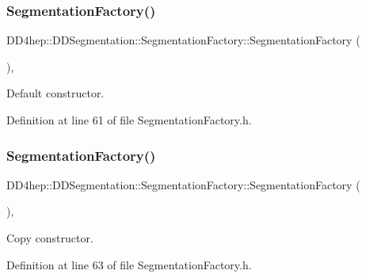 \subsubsection{\texorpdfstring{Segmentation\+Factory()}{SegmentationFactory()}\hspace{0.1cm}{\footnotesize\ttfamily [1/2]}}
{\footnotesize\ttfamily D\+D4hep\+::\+D\+D\+Segmentation\+::\+Segmentation\+Factory\+::\+Segmentation\+Factory (\begin{DoxyParamCaption}{ }\end{DoxyParamCaption})\hspace{0.3cm}{\ttfamily [inline]}, {\ttfamily [protected]}}



Default constructor. 



Definition at line 61 of file Segmentation\+Factory.\+h.

\hypertarget{class_d_d4hep_1_1_d_d_segmentation_1_1_segmentation_factory_a6255e4a05ac17c8e9d14d602dbc9d925}{}\label{class_d_d4hep_1_1_d_d_segmentation_1_1_segmentation_factory_a6255e4a05ac17c8e9d14d602dbc9d925} 
\subsubsection{\texorpdfstring{Segmentation\+Factory()}{SegmentationFactory()}\hspace{0.1cm}{\footnotesize\ttfamily [2/2]}}
{\footnotesize\ttfamily D\+D4hep\+::\+D\+D\+Segmentation\+::\+Segmentation\+Factory\+::\+Segmentation\+Factory (\begin{DoxyParamCaption}\item[{const \hyperlink{class_d_d4hep_1_1_d_d_segmentation_1_1_segmentation_factory}{Segmentation\+Factory} \&}]{ }\end{DoxyParamCaption})\hspace{0.3cm}{\ttfamily [inline]}, {\ttfamily [protected]}}



Copy constructor. 



Definition at line 63 of file Segmentation\+Factory.\+h.

